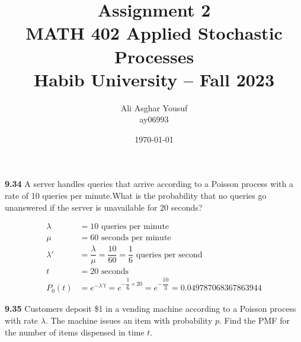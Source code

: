\documentclass[answers]{exam}
\title{Assignment 2\\ MATH 402 Applied Stochastic Processes\\ Habib University -- Fall 2023}
\author{Ali Asghar Yousuf \\ ay06993}  %
\date{\today}
\begin{document}
\maketitle

\begin{questions}
    \question \textbf{9.34} A server handles queries that arrive according to a Poisson process with a rate of 10 queries
    per minute.What is the probability that no queries go unanswered if the server is unavailable
    for 20 seconds?
    \begin{solution}
        \begin{align*}
            \lambda  & = 10 \text{ queries per minute}                                                             \\
            \mu      & = 60 \text{ seconds per minute}                                                             \\
            \lambda' & = \dfrac{\lambda}{\mu} = \dfrac{10}{60} = \dfrac{1}{6} \text{ queries per second}           \\
            t        & = 20 \text{ seconds}                                                                        \\
            P_0(t)   & = e^{-\lambda' t} = e^{-\dfrac{1}{6} \times 20} = e^{-\dfrac{10}{3}} = 0.049787068367863944
        \end{align*}
    \end{solution}

    \question \textbf{9.35} Customers deposit \$1 in a vending machine according to a Poisson process with rate $\lambda$.
    The machine issues an item with probability $p$. Find the PMF for the number of items dispensed in time $t$.


\end{questions}
\end{document}
